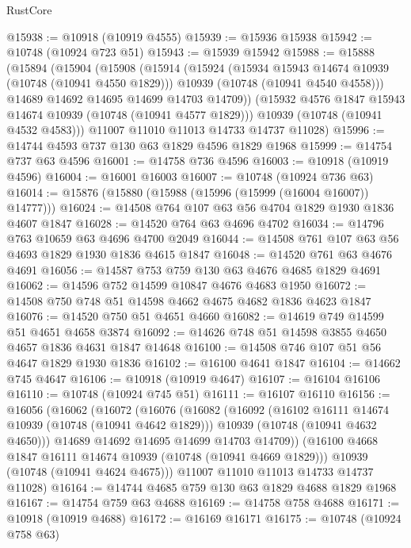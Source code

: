 \begin{lexlean}{RustCore}
\begin{coremodule}
@15938 := @10918 (@10919 @4555)
@15939 := @15936 @15938
@15942 := @10748 (@10924 @723 @51)
@15943 := @15939 @15942
@15988 := @15888
    (@15894
      (@15904
        (@15908
          (@15914
            (@15924
              (@15934 @15943 @14674 @10939 (@10748 (@10941 @4550 @1829)))
              @10939
              (@10748 (@10941 @4540 @4558)))
            @14689
            @14692
            @14695
            @14699
            @14703
            @14709))
        (@15932 @4576 @1847 @15943 @14674 @10939 (@10748 (@10941 @4577 @1829)))
        @10939
        (@10748 (@10941 @4532 @4583)))
      @11007
      @11010
      @11013
      @14733
      @14737
      @11028)
@15996 := @14744 @4593 @737 @130 @63 @1829 @4596 @1829 @1968
@15999 := @14754 @737 @63 @4596
@16001 := @14758 @736 @4596
@16003 := @10918 (@10919 @4596)
@16004 := @16001 @16003
@16007 := @10748 (@10924 @736 @63)
@16014 := @15876 (@15880 (@15988 (@15996 (@15999 (@16004 @16007)) @14777)))
@16024 := @14508 @764 @107 @63 @56 @4704 @1829 @1930 @1836 @4607 @1847
@16028 := @14520 @764 @63 @4696 @4702
@16034 := @14796 @763 @10659 @63 @4696 @4700 @2049
@16044 := @14508 @761 @107 @63 @56 @4693 @1829 @1930 @1836 @4615 @1847
@16048 := @14520 @761 @63 @4676 @4691
@16056 := @14587 @753 @759 @130 @63 @4676 @4685 @1829 @4691
@16062 := @14596 @752 @14599 @10847 @4676 @4683 @1950
@16072 := @14508 @750 @748 @51 @14598 @4662 @4675 @4682 @1836 @4623 @1847
@16076 := @14520 @750 @51 @4651 @4660
@16082 := @14619 @749 @14599 @51 @4651 @4658 @3874
@16092 := @14626 @748 @51 @14598 @3855 @4650 @4657 @1836 @4631 @1847 @14648
@16100 := @14508 @746 @107 @51 @56 @4647 @1829 @1930 @1836
@16102 := @16100 @4641 @1847
@16104 := @14662 @745 @4647
@16106 := @10918 (@10919 @4647)
@16107 := @16104 @16106
@16110 := @10748 (@10924 @745 @51)
@16111 := @16107 @16110
@16156 := @16056
    (@16062
      (@16072
        (@16076
          (@16082
            (@16092
              (@16102 @16111 @14674 @10939 (@10748 (@10941 @4642 @1829)))
              @10939
              (@10748 (@10941 @4632 @4650)))
            @14689
            @14692
            @14695
            @14699
            @14703
            @14709))
        (@16100 @4668 @1847 @16111 @14674 @10939 (@10748 (@10941 @4669 @1829)))
        @10939
        (@10748 (@10941 @4624 @4675)))
      @11007
      @11010
      @11013
      @14733
      @14737
      @11028)
@16164 := @14744 @4685 @759 @130 @63 @1829 @4688 @1829 @1968
@16167 := @14754 @759 @63 @4688
@16169 := @14758 @758 @4688
@16171 := @10918 (@10919 @4688)
@16172 := @16169 @16171
@16175 := @10748 (@10924 @758 @63)

\end{coremodule}
\end{lexlean}
